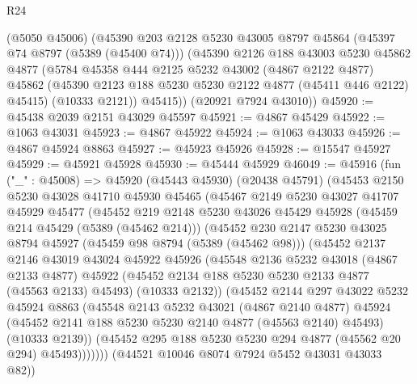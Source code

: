 \begin{lexlean}{R24}
\begin{coremodule}
      (@5050 @45006)
      (@45390
        @203
        @2128
        @5230
        @43005
        @8797
        @45864
        (@45397 @74 @8797 (@5389 (@45400 @74)))
        (@45390
          @2126
          @188
          @43003
          @5230
          @45862
          @4877
          (@5784
            @45358
            @444
            @2125
            @5232
            @43002
            (@4867 @2122 @4877)
            @45862
            (@45390 @2123 @188 @5230 @5230 @2122 @4877 (@45411 @446 @2122) @45415)
            (@10333 @2121))
          @45415))
      (@20921 @7924 @43010))
@45920 := @45438 @2039 @2151 @43029 @45597
@45921 := @4867 @45429
@45922 := @1063 @43031
@45923 := @4867 @45922
@45924 := @1063 @43033
@45926 := @4867 @45924 @8863
@45927 := @45923 @45926
@45928 := @15547 @45927
@45929 := @45921 @45928
@45930 := @45444 @45929
@46049 := @45916
    (fun ("_" : @45008) =>
    @45920
      (@45443 @45930)
      (@20438 @45791)
      (@45453
        @2150
        @5230
        @43028
        @41710
        @45930
        @45465
        (@45467
          @2149
          @5230
          @43027
          @41707
          @45929
          @45477
          (@45452
            @219
            @2148
            @5230
            @43026
            @45429
            @45928
            (@45459 @214 @45429 (@5389 (@45462 @214)))
            (@45452
              @230
              @2147
              @5230
              @43025
              @8794
              @45927
              (@45459 @98 @8794 (@5389 (@45462 @98)))
              (@45452
                @2137
                @2146
                @43019
                @43024
                @45922
                @45926
                (@45548
                  @2136
                  @5232
                  @43018
                  (@4867 @2133 @4877)
                  @45922
                  (@45452 @2134 @188 @5230 @5230 @2133 @4877 (@45563 @2133) @45493)
                  (@10333 @2132))
                (@45452
                  @2144
                  @297
                  @43022
                  @5232
                  @45924
                  @8863
                  (@45548
                    @2143
                    @5232
                    @43021
                    (@4867 @2140 @4877)
                    @45924
                    (@45452 @2141 @188 @5230 @5230 @2140 @4877 (@45563 @2140) @45493)
                    (@10333 @2139))
                  (@45452 @295 @188 @5230 @5230 @294 @4877 (@45562 @20 @294) @45493)))))))
      (@44521 @10046 @8074 @7924 @5452 @43031 @43033 @82))

\end{coremodule}
\end{lexlean}
